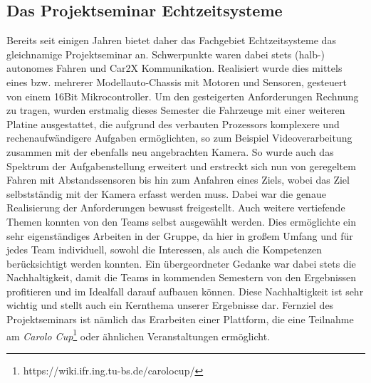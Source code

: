 \subsection{Das Projektseminar Echtzeitsysteme}
Bereits seit einigen Jahren bietet daher das Fachgebiet Echtzeitsysteme das gleichnamige Projektseminar an. Schwerpunkte waren dabei stets (halb-) autonomes Fahren und Car2X Kommunikation. Realisiert wurde dies mittels eines bzw. mehrerer Modellauto-Chassis mit Motoren und Sensoren, gesteuert von einem 16Bit Mikrocontroller. Um den gesteigerten Anforderungen Rechnung zu tragen, wurden erstmalig dieses Semester die Fahrzeuge mit einer weiteren Platine ausgestattet, die aufgrund des verbauten Prozessors komplexere und rechenaufwändigere Aufgaben ermöglichten, so zum Beispiel Videoverarbeitung zusammen mit der ebenfalls neu angebrachten Kamera. So wurde auch das Spektrum der Aufgabenstellung erweitert und erstreckt sich nun von geregeltem Fahren mit Abstandssensoren bis hin zum Anfahren eines Ziels, wobei das Ziel selbstständig mit der Kamera erfasst werden muss. Dabei war die genaue Realisierung der Anforderungen bewusst freigestellt. Auch weitere vertiefende Themen konnten von den Teams selbst ausgewählt werden. Dies ermöglichte ein sehr eigenständiges Arbeiten in der Gruppe, da hier in großem Umfang und für jedes Team individuell, sowohl die Interessen, als auch die Kompetenzen berücksichtigt werden konnten.
\pagebreak \newline
Ein übergeordneter Gedanke war dabei stets die Nachhaltigkeit, damit die Teams in kommenden Semestern von den Ergebnissen profitieren und im Idealfall darauf aufbauen können. Diese Nachhaltigkeit ist sehr wichtig und stellt auch ein Kernthema unserer Ergebnisse dar. Fernziel des Projektseminars ist nämlich das Erarbeiten einer Plattform, die eine Teilnahme am \textit{Carolo Cup}\footnote[1]{https://wiki.ifr.ing.tu-bs.de/carolocup/} oder ähnlichen Veranstaltungen ermöglicht.
